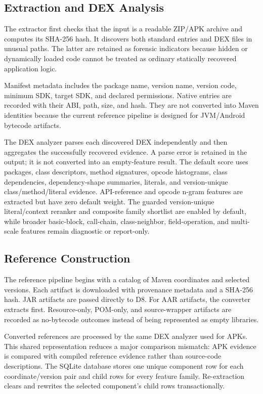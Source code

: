 \subsection{Extraction and DEX Analysis}

The extractor first checks that the input is a readable ZIP/APK archive and
computes its SHA-256 hash. It discovers both standard
 entries and DEX files in unusual paths. The latter are
retained as forensic indicators because hidden or dynamically loaded code
cannot be treated as ordinary statically recovered application logic.

Manifest metadata includes the package name, version name, version code,
minimum SDK, target SDK, and declared permissions. Native
 entries are recorded with their ABI, path, size, and hash. They are
not converted into Maven identities because the current reference pipeline is
designed for JVM/Android bytecode artifacts.

The DEX analyzer parses each discovered DEX independently and then aggregates
the successfully recovered evidence. A parse error is retained in the output;
it is not converted into an empty-feature result. The default score uses
packages, class descriptors, method signatures, opcode histograms, class
dependencies, dependency-shape summaries, literals, and version-unique
class/method/literal evidence. API-reference and opcode n-gram features are
extracted but have zero default weight. The guarded version-unique
literal/context reranker and composite family shortlist are enabled by
default, while broader basic-block, call-chain, class-neighbor,
field-operation, and multi-scale features remain diagnostic or report-only.

\subsection{Reference Construction}

The reference pipeline begins with a catalog of Maven coordinates and selected
versions. Each artifact is downloaded with provenance metadata and a SHA-256
hash. JAR artifacts are passed directly to D8. For AAR artifacts, the
converter extracts  first. Resource-only, POM-only, and
source-wrapper artifacts are recorded as no-bytecode outcomes instead of
being represented as empty libraries.

Converted references are processed by the same DEX analyzer used for APKs.
This shared representation reduces a major comparison mismatch: APK evidence
is compared with compiled reference evidence rather than source-code
descriptions. The SQLite database stores one unique component row for each
coordinate/version pair and child rows for every feature family. Re-extraction
clears and rewrites the selected component's child rows transactionally.

